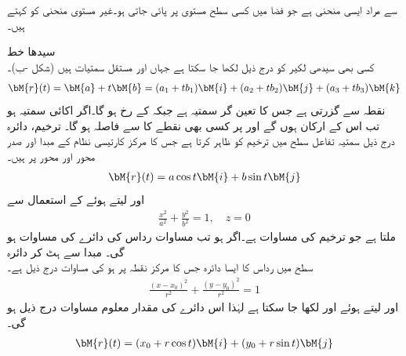  سے مراد ایسی منحنی ہے جو فضا میں کسی سطح مستوی پر پائی جاتی ہو۔غیر مستوی منحنی کو  کہتے ہیں۔

\quad سیدھا خط\\
کسی بھی سیدھی لکیر  کو درج ذیل لکھا جا سکتا ہے جہاں  اور  مستقل سمتیات ہیں (شکل -ب)۔
\begin{align}
\bM{r}(t)=\bM{a}+t\bM{b}=(a_1+tb_1)\bM{i}+(a_2+tb_2)\bM{j}+(a_3+tb_3)\bM{k}
\end{align}
 نقطہ  سے گزرتی ہے جس کا تعین گر سمتیہ  ہے جبکہ  کے رخ   ہو گا۔اگر  اکائی سمتیہ ہو تب اس کے ارکان  ہوں گے اور  پر کسی بھی نقطے کا  سے فاصلہ   ہو گا۔
\quad ترخیم، دائرہ\\
درج ذیل سمتیہ  تفاعل  سطح میں ترخیم کو ظاہر کرتا ہے جس کا مرکز کارتیسی نظام کے مبدا  اور صدر محور  اور محور  پر ہیں۔  
\begin{align}\label{مساوات_الاحصاء_ترخیم_الف}
\bM{r}(t)=a\cos t \bM{i}+b\sin t\bM{j}
\end{align}
 اور  لیتے ہوئے  کے استعمال سے 
\begin{align}
\frac{x^2}{a^2}+\frac{y^2}{b^2}=1, \quad z=0
\end{align}
ملتا ہے جو ترخیم کی مساوات ہے۔اگر  ہو تب مساوات  رداس  کی دائرے کی مساوات ہو گی۔
\quad مبدا سے ہٹ کر دائرہ\\
 سطح میں رداس  کا  ایسا دائرہ جس کا مرکز نقطہ  پر ہو کی مساوات درج ذیل ہے۔
\begin{align*}
\frac{(x-x_0)^2}{r^2}+\frac{(y-y_0)^2}{r^2}=1
\end{align*} 
 اور  لیتے ہوئے  اور  لکھا جا سکتا ہے لہٰذا اس دائرے کی مقدار معلوم مساوات درج ذیل ہو گی۔
\begin{align}
\bM{r}(t)=(x_0+r\cos t)\bM{i}+(y_0+r\sin t)\bM{j}
\end{align} 

